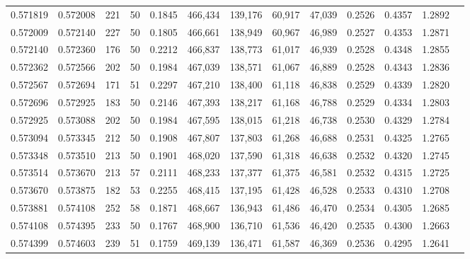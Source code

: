 \begin{tabular}{rrrrrrrrrrrrr}
0.571819 & 0.572008 &   221 &  50 &                                     0.1845 & 466,434 & 139,176 &  60,917 &  47,039 & 0.2526 & 0.4357 & 1.2892 \\
0.572009 & 0.572140 &   227 &  50 &                                     0.1805 & 466,661 & 138,949 &  60,967 &  46,989 & 0.2527 & 0.4353 & 1.2871 \\
0.572140 & 0.572360 &   176 &  50 &                                     0.2212 & 466,837 & 138,773 &  61,017 &  46,939 & 0.2528 & 0.4348 & 1.2855 \\
0.572362 & 0.572566 &   202 &  50 &                                     0.1984 & 467,039 & 138,571 &  61,067 &  46,889 & 0.2528 & 0.4343 & 1.2836 \\
0.572567 & 0.572694 &   171 &  51 &                                     0.2297 & 467,210 & 138,400 &  61,118 &  46,838 & 0.2529 & 0.4339 & 1.2820 \\
0.572696 & 0.572925 &   183 &  50 &                                     0.2146 & 467,393 & 138,217 &  61,168 &  46,788 & 0.2529 & 0.4334 & 1.2803 \\
0.572925 & 0.573088 &   202 &  50 &                                     0.1984 & 467,595 & 138,015 &  61,218 &  46,738 & 0.2530 & 0.4329 & 1.2784 \\
0.573094 & 0.573345 &   212 &  50 &                                     0.1908 & 467,807 & 137,803 &  61,268 &  46,688 & 0.2531 & 0.4325 & 1.2765 \\
0.573348 & 0.573510 &   213 &  50 &                                     0.1901 & 468,020 & 137,590 &  61,318 &  46,638 & 0.2532 & 0.4320 & 1.2745 \\
0.573514 & 0.573670 &   213 &  57 &                                     0.2111 & 468,233 & 137,377 &  61,375 &  46,581 & 0.2532 & 0.4315 & 1.2725 \\
0.573670 & 0.573875 &   182 &  53 &                                     0.2255 & 468,415 & 137,195 &  61,428 &  46,528 & 0.2533 & 0.4310 & 1.2708 \\
0.573881 & 0.574108 &   252 &  58 &                                     0.1871 & 468,667 & 136,943 &  61,486 &  46,470 & 0.2534 & 0.4305 & 1.2685 \\
0.574108 & 0.574395 &   233 &  50 &                                     0.1767 & 468,900 & 136,710 &  61,536 &  46,420 & 0.2535 & 0.4300 & 1.2663 \\
0.574399 & 0.574603 &   239 &  51 &                                     0.1759 & 469,139 & 136,471 &  61,587 &  46,369 & 0.2536 & 0.4295 & 1.2641 \\

\end{tabular}
